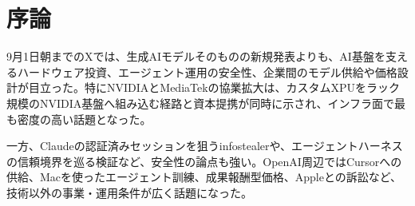 \section{序論}
9月1日朝までのXでは、生成AIモデルそのものの新規発表よりも、AI基盤を支えるハードウェア投資、エージェント運用の安全性、企業間のモデル供給や価格設計が目立った。特にNVIDIAとMediaTekの協業拡大は、カスタムXPUをラック規模のNVIDIA基盤へ組み込む経路と資本提携が同時に示され、インフラ面で最も密度の高い話題となった。

一方、Claudeの認証済みセッションを狙うinfostealerや、エージェントハーネスの信頼境界を巡る検証など、安全性の論点も強い。OpenAI周辺ではCursorへの供給、Macを使ったエージェント訓練、成果報酬型価格、Appleとの訴訟など、技術以外の事業・運用条件が広く話題になった。
